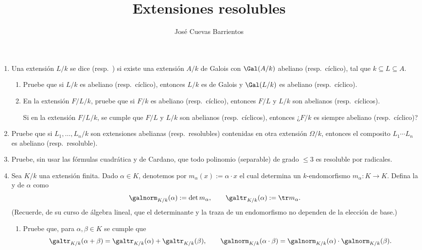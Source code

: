 \documentclass[11pt, reqno]{amsart}
\title{Extensiones resolubles}
\date{\DTMdate{2025-04-03}}
\author{José Cuevas Barrientos}
\begin{document}
\maketitle

\nocite{nagata:fields}
\nocite{lang:algebra}

\begin{enumerate}
	\item Una extensión $L/k$ se dice  (resp.\ ) si existe una extensión
		$A/k$ de Galois con $\Gal(A/k)$ abeliano (resp.\ cíclico), tal que $k \subseteq L \subseteq A$.

		\begin{enumerate}
			\item Pruebe que si $L/k$ es abeliano (resp.\ cíclico), entonces $L/k$ es de Galois y
				$\Gal(L/k)$ es abeliano (resp.\ cíclico).
			\item En la extensión $F/L/k$, pruebe que si $F/k$ es abeliano (resp.\ cíclico), entonces $F/L$
				y $L/k$ son abelianos (resp.\ cíclicos).

				\begin{prob}
					\lookup
					Si en la extensión $F/L/k$, se cumple que $F/L$ y $L/k$ son abelianos (resp.\
					cíclicos), entonces ¿$F/k$ es siempre abeliano (resp.\ cíclico)?
				\end{prob}
		\end{enumerate}

	\item Pruebe que si $L_1, \dots, L_n / k$ son extensiones abelianas (resp.\ resolubles) contenidas en otra
		extensión $\Omega/k$, entonces el composito $L_1 \cdots L_n$ es abeliano (resp.\ resoluble).

	\item\lookright
		Pruebe, sin usar las fórmulas cuadrática y de Cardano, que todo polinomio (separable) de grado
		$\le 3$ es resoluble por radicales.

	\item Sea $K/k$ una extensión finita.
		Dado $\alpha \in K$, denotemos por $m_\alpha(x) := \alpha\cdot x$ el cual determina un $k$-endomorfismo
		$m_\alpha \colon K \to K$.
		Defina la  y  de $\alpha$ como
		\[
			\galnorm_{K/k}(\alpha) := \det m_\alpha, \qquad \galtr_{K/k}(\alpha) := \tr m_\alpha.
		\]
		(Recuerde, de su curso de álgebra lineal, que el determinante y la traza de un endomorfismo no dependen
		de la elección de base.)
		\begin{enumerate}
			\item Pruebe que, para $\alpha, \beta \in K$ se cumple que
				\[
					\galtr_{K/k}(\alpha + \beta) = \galtr_{K/k}(\alpha) + \galtr_{K/k}(\beta),
					\qquad
					\galnorm_{K/k}(\alpha \cdot \beta) = \galnorm_{K/k}(\alpha) \cdot \galnorm_{K/k}(\beta).
				\]


\end{enumerate}
\end{enumerate}
\end{document}
